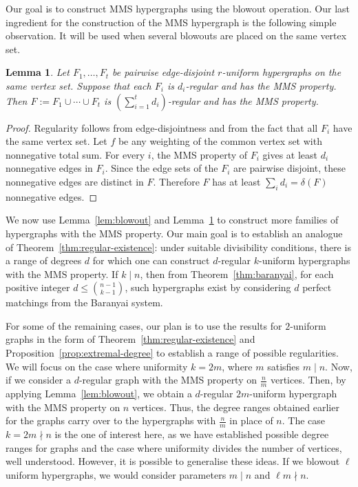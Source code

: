 \documentclass[12pt,UKenglish]{amsart}
\theoremstyle{plain}
\newtheorem{lemma}[thm]{Lemma}
\theoremstyle{definition}
\theoremstyle{remark}
\begin{document}
Our goal is to construct MMS hypergraphs using the blowout operation. Our last ingredient for the construction of the MMS hypergraph is the following simple observation. It will be used when several blowouts are placed on the same vertex set.
\begin{lemma}\label{lem:edge-disjoint-union}
Let $F_1,\dots,F_t$ be pairwise edge-disjoint $r$-uniform hypergraphs on the same vertex set. Suppose that each $F_i$ is $d_i$-regular and has the MMS property. Then $F:=F_1\cup\cdots\cup F_t$ is $\left(\sum_{i=1}^t d_i\right)$-regular and has the MMS property.
\end{lemma}
\begin{proof}
Regularity follows from edge-disjointness and from the fact that all $F_i$ have the same vertex set. Let $f$ be any weighting of the common vertex set with nonnegative total sum. For every $i$, the MMS property of $F_i$ gives at least $d_i$ nonnegative edges in $F_i$. Since the edge sets of the $F_i$ are pairwise disjoint, these nonnegative edges are distinct in $F$. Therefore $F$ has at least $\sum_i d_i=\delta(F)$ nonnegative edges.
\end{proof}
 
We now use Lemma~\ref{lem:blowout} and Lemma~\ref{lem:edge-disjoint-union} to construct more families of hypergraphs with the MMS property. Our main goal is to establish an analogue of Theorem~\ref{thm:regular-existence}: under suitable divisibility conditions, there is a range of degrees $d$ for which one can construct $d$-regular $k$-uniform hypergraphs with the MMS property.  If $k\mid n$, then from Theorem~\ref{thm:baranyai}, for each positive integer $d\le\binom{n-1}{k-1}$, such hypergraphs exist by considering $d$ perfect matchings from the Baranyai system.
 
 For some of the remaining cases, our plan is to use the results for $2$-uniform graphs in the form of Theorem~\ref{thm:regular-existence} and Proposition~\ref{prop:extremal-degree} to establish a range of possible regularities. We will focus on the case where uniformity $k=2m$, where $m$ satisfies $m\mid n$. Now, if we consider a $d$-regular graph with the MMS property on $\frac nm$ vertices. Then, by applying Lemma~\ref{lem:blowout}, we obtain a $d$-regular $2m$-uniform hypergraph with the MMS property on $n$ vertices. Thus, the degree ranges obtained earlier for the graphs carry over to the hypergraphs with $\frac nm$ in place of $n$. The case $k=2m\nmid n$ is the one of interest here, as we have established possible degree ranges for graphs and the case where uniformity divides the number of vertices, well understood. However, it is possible to generalise these ideas. If we blowout $\ell$ uniform hypergraphs, we would consider parameters $m\mid n$ and $\ell m\nmid n$. 
 
\end{document}
